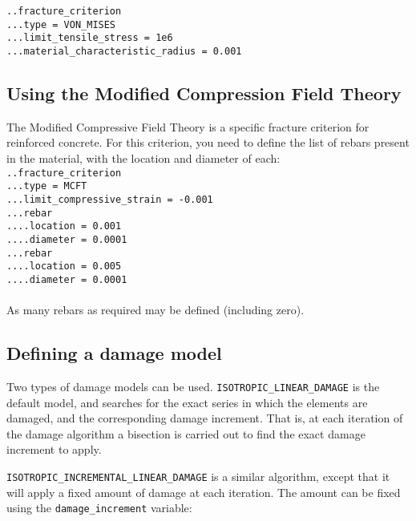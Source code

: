 \documentclass[10pt]{article}
\begin{document}
\noindent \verb+..fracture_criterion+\\
\verb+...type = VON_MISES+\\
\verb+...limit_tensile_stress = 1e6+\\
\verb+...material_characteristic_radius = 0.001+\\

\subsection{Using the Modified Compression Field Theory}

The Modified Compressive Field Theory is a specific fracture criterion for reinforced concrete. For this criterion, you need to define the list of rebars present in the material, with the location and diameter of each:\\

\noindent \verb+..fracture_criterion+\\
\verb+...type = MCFT+\\
\verb+...limit_compressive_strain = -0.001+\\
\verb+...rebar+\\
\verb+....location = 0.001+\\
\verb+....diameter = 0.0001+\\
\verb+...rebar+\\
\verb+....location = 0.005+\\
\verb+....diameter = 0.0001+

\paragraph{} As many rebars as required may be defined (including zero).

\subsection{Defining a damage model}

Two types of damage models can be used. \verb+ISOTROPIC_LINEAR_DAMAGE+ is the default model, and searches for the exact series in which the elements are damaged, and the corresponding damage increment. That is, at each iteration of the damage algorithm a bisection is carried out to find the exact damage increment to apply.

\verb+ISOTROPIC_INCREMENTAL_LINEAR_DAMAGE+ is a similar algorithm, except that it will apply a fixed amount of damage at each iteration. The amount can be fixed using the \verb+damage_increment+ variable:\\
\end{document}
